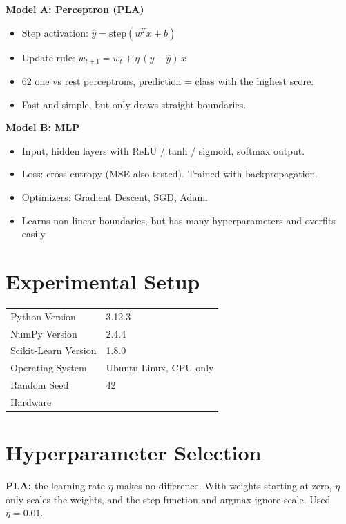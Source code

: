 \documentclass[12pt,a4paper]{article}
\begin{document}
\textbf{Model A: Perceptron (PLA)}
\begin{itemize}
\item Step activation: $\hat y = \mathrm{step}(w^Tx+b)$
\item Update rule: $w_{t+1} = w_t + \eta\,(y-\hat y)\,x$
\item 62 one vs rest perceptrons, prediction = class with the highest score.
\item Fast and simple, but only draws straight boundaries.
\end{itemize}

\textbf{Model B: MLP}
\begin{itemize}
\item Input, hidden layers with ReLU / tanh / sigmoid, softmax output.
\item Loss: cross entropy (MSE also tested). Trained with backpropagation.
\item Optimizers: Gradient Descent, SGD, Adam.
\item Learns non linear boundaries, but has many hyperparameters and overfits easily.
\end{itemize}




\section{Experimental Setup}
\begin{tabular}{ll}
\toprule
Python Version & 3.12.3 \\
NumPy Version & 2.4.4 \\
Scikit-Learn Version & 1.8.0 \\
Operating System & Ubuntu Linux, CPU only \\
Random Seed & 42 \\
Hardware & \\
\bottomrule
\end{tabular}

\section{Hyperparameter Selection}
\textbf{PLA:} the learning rate $\eta$ makes no difference. With weights starting at zero, $\eta$ only scales
the weights, and the step function and argmax ignore scale. Used $\eta = 0.01$.
\end{document}
